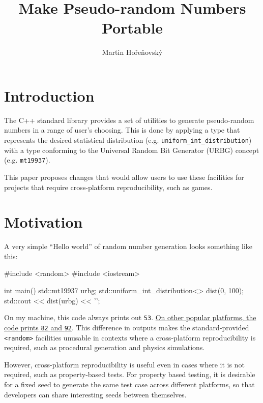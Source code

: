 \documentclass{wg21}
\title{Make Pseudo-random Numbers Portable}
\author{Martin Hořeňovský}{martin.horenovsky@gmail.com}
\begin{document}
\maketitle



\hypertarget{introduction}{%
	\section{Introduction}\label{introduction}}

The C++ standard library provides a set of utilities to generate
pseudo-random numbers in a range of user's choosing. This is done
by applying a type that represents the desired statistical distribution
(e.g. \texttt{uniform\_int\_distribution}) with a type conforming
to the Universal Random Bit Generator (URBG) concept (e.g. \texttt{mt19937}).

This paper proposes changes that would allow users to use these facilities
for projects that require cross-platform reproducibility, such as games.


\hypertarget{motivation}{%
    \section{Motivation}\label{motivation}}

A very simple ``Hello world'' of random number generation looks something
like this:

\begin{codeblock}
#include <random>
#include <iostream>

int main() {
    std::mt19937 urbg;
    std::uniform_int_distribution<> dist(0, 100);
    std::cout << dist(urbg) << '\n';
}
\end{codeblock}

On my machine, this code always prints out \texttt{53}. \href{https://godbolt.org/z/dB7H_2}{On other
popular platforms, the code prints \texttt{82} and \texttt{92}}. This
difference in outputs makes the standard-provided \texttt{<random>}
facilities unusable in contexts where a cross-platform reproducibility
is required, such as procedural generation and physics simulations.

However, cross-platform reproducibility is useful even in cases
where it is not required, such as property-based tests. For property
based testing, it is desirable for a fixed seed to generate the same
test case across different platforms, so that developers can share
interesting seeds between themselves.
\end{document}
